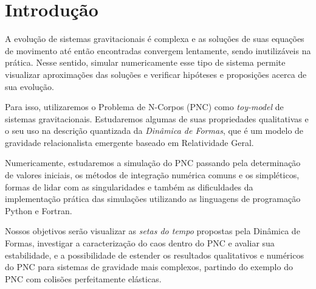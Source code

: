 
\section{Introdução}
\label{sec:introducao}

A evolução de sistemas gravitacionais é complexa e as soluções de suas equações de movimento até então encontradas convergem lentamente, sendo inutilizáveis na prática. Nesse sentido, simular numericamente esse tipo de sistema permite visualizar aproximações das soluções e verificar hipóteses e proposições acerca de sua evolução.

Para isso, utilizaremos o Problema de N-Corpos (PNC) como \textit{toy-model} de sistemas gravitacionais. Estudaremos algumas de suas propriedades qualitativas e o seu uso na descrição quantizada da \textit{Dinâmica de Formas}, que é um modelo de gravidade relacionalista emergente baseado em Relatividade Geral. 

Numericamente, estudaremos a simulação do PNC passando pela determinação de valores iniciais, os métodos de integração numérica comuns e os simpléticos, formas de lidar com as singularidades e também as dificuldades da implementação prática das simulações utilizando as linguagens de programação Python e Fortran.

Nossos objetivos serão visualizar as \textit{setas do tempo} propostas pela Dinâmica de Formas, investigar a caracterização do caos dentro do PNC e avaliar sua estabilidade, e a possibilidade de estender os resultados qualitativos e numéricos do PNC para sistemas de gravidade mais complexos, partindo do exemplo do PNC com colisões perfeitamente elásticas.